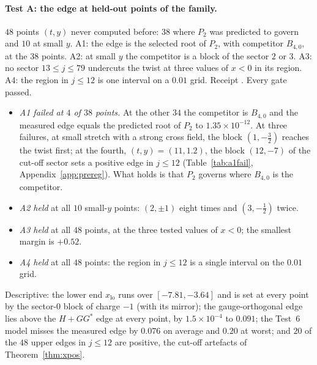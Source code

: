 \documentclass[11pt]{article}
\theoremstyle{definition}
\theoremstyle{remark}
\begin{document}
\paragraph{Test A: the edge at held-out points of the family.} $48$ points $(t,y)$ never computed before: $38$ where
$P_2$ was predicted to govern and $10$ at small $y$. A1: the edge is the selected root of $P_2$, with competitor
$B_{4,0}$, at the $38$ points. A2: at small $y$ the competitor is a block of the sector $2$ or $3$. A3: no sector
$13\le j\le79$ undercuts the twist at three values of $x<0$ in its region. A4: the region in $j\le12$ is one interval on
a $0.01$ grid. Receipt . Every gate passed.
\begin{itemize}
  \item \emph{A1 failed at $4$ of $38$ points.} At the other $34$ the competitor is $B_{4,0}$ and the measured edge
  equals the predicted root of $P_2$ to $1.35\times10^{-12}$. At three failures, at small stretch with a strong cross
  field, the block $(1,-\tfrac32)$ reaches the twist first; at the fourth, $(t,y)=(11,1.2)$, the block $(12,-7)$ of the
  cut-off sector sets a positive edge in $j\le12$ (Table~\ref{tab:a1fail}, Appendix~\ref{app:prereg}). What holds is that
  $P_2$ governs where $B_{4,0}$ is the competitor.
  \item \emph{A2 held} at all $10$ small-$y$ points: $(2,\pm1)$ eight times and $(3,-\tfrac12)$ twice.
  \item \emph{A3 held} at all $48$ points, at the three tested values of $x<0$; the smallest margin is $+0.52$.
  \item \emph{A4 held} at all $48$ points: the region in $j\le12$ is a single interval on the $0.01$ grid.
\end{itemize}
Descriptive: the lower end $x_{\mathrm{lo}}$ runs over $[-7.81,-3.64]$ and is set at every point by the sector-$0$ block of
charge $-1$ (with its mirror); the gauge-orthogonal edge lies above the $H+GG^*$ edge at every point, by
$1.5\times10^{-4}$ to $0.091$; the Test~6 model misses the measured edge by $0.076$ on average and $0.20$ at worst; and
$20$ of the $48$ upper edges in $j\le12$ are positive, the cut-off artefacts of Theorem~\ref{thm:xpos}.
\end{document}
